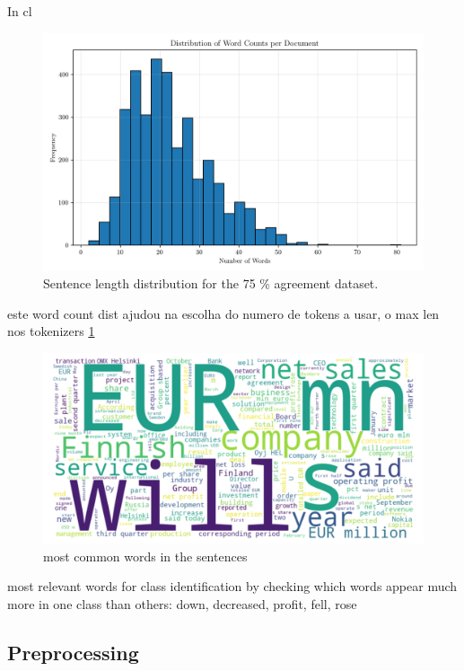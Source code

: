 \documentclass[conference]{IEEEtran}
\begin{document}
In cl
\begin{figure}[H]
    \centering
    \includegraphics[width=1\linewidth]{assets/word_count_distribution.png}
    \caption{Sentence length distribution for the 75 \% agreement dataset.}
    \label{fig:word_count_distribution}
\end{figure}

este word count dist ajudou na escolha do numero de tokens a usar, o max len nos tokenizers \ref{fig:word_count_distribution}

\begin{figure}[H]
    \centering
    \includegraphics[width=1\linewidth]{assets/word_cloud_75agree.png}
    \caption{most common words in the sentences}
    \label{fig:word_cloud_75agree}
\end{figure}

most relevant words for class identification by checking which words appear much more in one class than others: down, decreased, profit, fell, rose


\subsection{Preprocessing}
\end{document}
